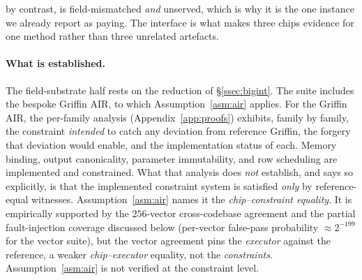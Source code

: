 by contrast, is field-mismatched \emph{and} unserved, which is why it is the one instance we already report as paying. The interface is what makes three chips evidence for one method rather than three unrelated artefacts.

\paragraph{What is established.}
The field-substrate half rests on the reduction of \S\ref{ssec:bigint}. The suite includes the bespoke Griffin AIR, to which Assumption~\ref{asm:air} applies. For the Griffin AIR, the per-family analysis (Appendix~\ref{app:proofs}) exhibits, family by family, the constraint \emph{intended} to catch any deviation from reference Griffin, the forgery that deviation would enable, and the implementation status of each. Memory binding, output canonicality, parameter immutability, and row scheduling are implemented and constrained. What that analysis does \emph{not} establish, and says so explicitly, is that the implemented constraint system is satisfied \emph{only} by reference-equal witnesses. Assumption~\ref{asm:air} names it the \emph{chip--constraint equality}. It is empirically supported by the $256$-vector cross-codebase agreement and the partial fault-injection coverage discussed below (per-vector false-pass probability $\approx 2^{-199}$ for the vector suite), but the vector agreement pins the \emph{executor} against the reference, a weaker \emph{chip--executor} equality, not the \emph{constraints}. Assumption~\ref{asm:air} is not verified at the constraint level.

